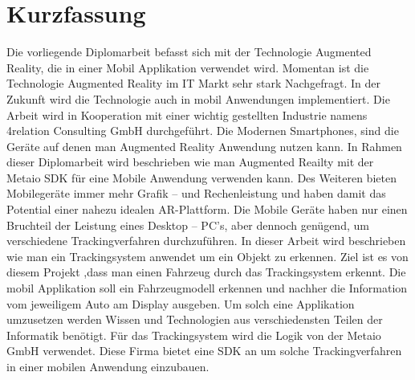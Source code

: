 \chapter*{Kurzfassung}

Die vorliegende Diplomarbeit befasst sich mit der Technologie Augmented Reality, die in einer Mobil Applikation verwendet wird. Momentan ist die Technologie Augmented Reality im IT Markt sehr stark Nachgefragt. In der Zukunft wird die Technologie auch in mobil Anwendungen implementiert. Die Arbeit wird in Kooperation mit einer wichtig gestellten Industrie namens 4relation Consulting GmbH durchgef{\"u}hrt. Die Modernen Smartphones,  sind die Ger{\"a}te  auf denen man Augmented Reality Anwendung nutzen kann. In Rahmen dieser Diplomarbeit wird beschrieben wie man Augmented Reailty mit der Metaio SDK f{\"u}r eine Mobile Anwendung verwenden kann. Des Weiteren bieten Mobileger{\"a}te  immer mehr Grafik -- und Rechenleistung und haben damit das Potential einer nahezu idealen AR-Plattform. Die Mobile Ger{\"a}te haben nur einen Bruchteil der Leistung eines Desktop -- PC's, aber dennoch gen{\"u}gend, um verschiedene Trackingverfahren durchzuf{\"u}hren. In dieser Arbeit wird beschrieben wie man ein Trackingsystem anwendet um ein Objekt zu erkennen. Ziel ist es von diesem Projekt ,dass man einen Fahrzeug durch das Trackingsystem erkennt. Die mobil Applikation soll ein Fahrzeugmodell erkennen und nachher die Information vom jeweiligem Auto am Display ausgeben. Um solch eine Applikation umzusetzen werden Wissen und Technologien aus verschiedensten Teilen der Informatik ben{\"o}tigt. F{\"u}r das Trackingsystem wird die Logik von der Metaio GmbH verwendet. Diese Firma bietet eine SDK an um solche Trackingverfahren in einer mobilen Anwendung einzubauen.